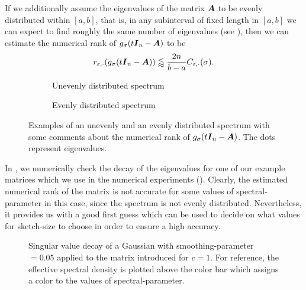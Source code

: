 If we additionally assume the eigenvalues of the matrix $\boldsymbol{A}$
to be evenly distributed within $[a, b]$, that is, in any subinterval of fixed length in
$[a, b]$ we can expect to find roughly the same number of eigenvalues (see ), then
we can estimate the numerical rank of $g_{\sigma}(t\boldsymbol{I}_n - \boldsymbol{A})$ to be
\begin{equation}
    r_{\varepsilon, \cdot}(g_{\sigma}(t\boldsymbol{I}_n - \boldsymbol{A})) \lessapprox \frac{2 n}{b - a} C_{\varepsilon, \cdot}(\sigma).
    \label{equ:3-nystrom-kernel-numerical-rank-even-eigenvalues}
\end{equation}

\begin{figure}[ht]
    \centering
    \begin{subfigure}[t]{0.45\columnwidth}
        
        \caption{Unevenly distributed spectrum}
    \end{subfigure}
    \begin{subfigure}[t]{0.45\columnwidth}
        
        \caption{Evenly distributed spectrum}
    \end{subfigure}
    \caption{Examples of an unevenly and an evenly distributed spectrum
    with some comments about the numerical rank of $g_{\sigma}(t\boldsymbol{I}_n - \boldsymbol{A})$.
    The dots represent eigenvalues.}
    \label{fig:3-nystrom-evenly-distributed-spectrum}
\end{figure}

In , we numerically check the decay
of the eigenvalues for one of our example matrices which we use in the numerical
experiments (). Clearly, the estimated
numerical rank of the matrix is not accurate for some values of \gls{spectral-parameter}
in this case, since the spectrum is
not evenly distributed. Nevertheless, it provides us with a good first
guess which can be used to decide on what values for \gls{sketch-size} to choose
in order to ensure a high accuracy.\\
\begin{figure}[ht]
    \centering
    
    \caption{Singular value decay of a Gaussian 
       with \gls{smoothing-parameter} $=0.05$ applied to the matrix introduced
        for $c=1$. For reference,
       the effective spectral density is plotted above the color bar which
       assigns a color to the values of \gls{spectral-parameter}.}
    \label{fig:3-nystrom-singular-value-decay}
\end{figure}

